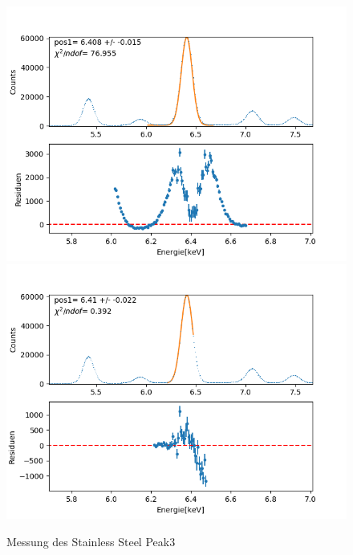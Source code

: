 \documentclass[12pt,a4paper]{article}
\begin{document}
\begin{figure}[H]
\centering
\includegraphics[scale=0.49]{Bilder/roentgen_spektren/stahl/rub3_1.png}
\includegraphics[scale=0.49]{Bilder/roentgen_spektren/stahl/rub3_2.png}
\caption{Messung des Stainless Steel Peak3}
\end{figure}
\end{document}
